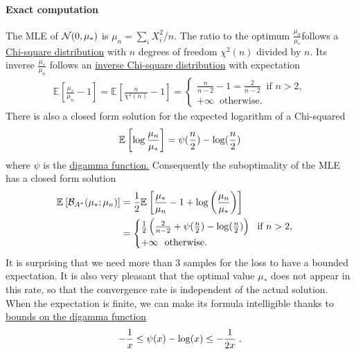 \documentclass{article}
\newenvironment{example}{
	\begin{mdframed}[backgroundcolor=light-gray, roundcorner=5pt]
}{		
	\end{mdframed}
}
\newcommand*{\expect}[2][]{\ensuremath{\mathbb{E}_{#1} \left[ #2 \right] }} %
\newcommand{\logpart}{A}
\newcommand{\bregmanconj}{\cB_{\logpart^*}}
\begin{document}
\begin{example}
	\paragraph{Exact computation}
	The MLE of ${\mathcal N}(0,\mu_*)$ is $\mu_n = \sum_i X_i^2 /n$. The ratio to the optimum  $\frac{\mu_n}{\mu_*}$follows a \href{https://en.wikipedia.org/wiki/Chi-square_distribution}{Chi-square distribution} with $n$ degrees of freedom $\chi^2(n)$ divided by $n$. Its inverse $\frac{\mu_*}{ \mu_n} $ follows an \href{https://en.wikipedia.org/wiki/Inverse-chi-squared_distribution}{inverse Chi-square distribution} with expectation 
	\begin{align}
		\expect{\frac{\mu_*}{ \mu_n}  - 1} 
		= \expect{\frac{n}{\chi^2(n)} - 1} =
		\begin{cases}
			\frac{n}{n-2} -1 = \frac{2}{n-2} \ \text{ if } n>2, \\
			+\infty \  \text{ otherwise. }
		\end{cases}
	\end{align}
	There is also a closed form solution for the expected logarithm of a Chi-squared\citep{pav2015moments}
	\begin{align}
		\expect{\log \frac{\mu_n}{\mu_*}} = \psi(\half[n]) - \log(\half[n])
	\end{align}
	where $\psi$ is the \href{https://en.wikipedia.org/wiki/Digamma_function}{digamma function.}
	Consequently the suboptimality of the MLE has a closed form solution
	\begin{align}
	\expect{\bregmanconj( \mu_*; \mu_n) }
	&= \half \expect{\frac{\mu_*}{ \mu_n} - 1 + \log \left(\frac{\mu_n}{\mu_*} \right) } \\
	& =
	\begin{cases}
		\half \left ( \frac{2}{n-2} +\psi(\half[n]) - \log(\half[n]) \right )  \ \text{ if } n>2, \\
			+\infty \  \text{ otherwise. }
	\end{cases}
	\end{align}
	It is surprising that we need more than $3$ samples for the loss to have a bounded expectation. 
	It is also very pleasant that the optimal value $\mu_*$ does not appear in this rate, so that the convergence rate is independent of the actual solution.
	When the expectation is finite, we can make its formula intelligible thanks to \href{https://en.wikipedia.org/wiki/Digamma_function#Inequalities}{bounds on the digamma function}
	\begin{align}
		-\inv{x} \leq \psi(x) - \log(x) \leq -\inv{2x}	\; .

\end{align}
\end{example}
\end{document}
